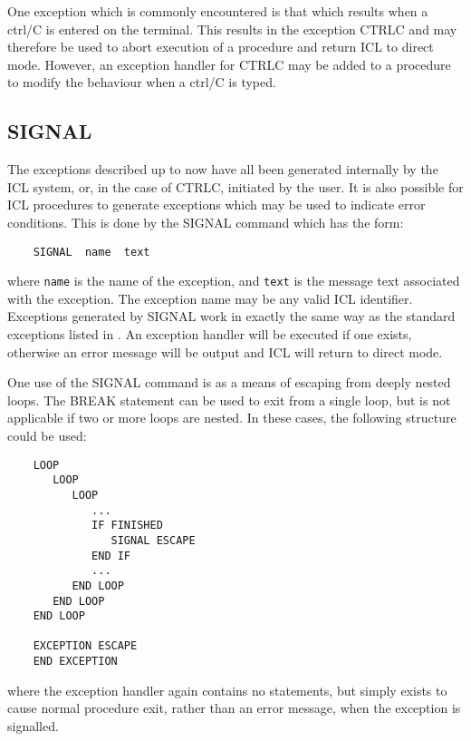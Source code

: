 One exception which is commonly encountered is that which results when a
ctrl/C is entered on the terminal.
This results in the exception CTRLC and may therefore be used to abort execution
of a procedure and return ICL to direct mode.
However, an exception handler for CTRLC may be added to a procedure to modify
the behaviour when a ctrl/C is typed.

\subsection{SIGNAL}

The exceptions described up to now have all been generated internally by the 
ICL system, or, in the case of CTRLC, initiated by the user.
It is also possible for ICL procedures to generate exceptions which may be used
to indicate error conditions.
This is done by the SIGNAL command which has the form:

\begin{small}
\begin{verbatim}
    SIGNAL  name  text
\end{verbatim}
\end{small}

where \verb+name+ is the name of the exception, and \verb+text+ is the message
text associated with the exception.
The exception name may be any valid ICL identifier.
Exceptions generated by SIGNAL work in exactly the same way as the standard
exceptions listed in .
An exception handler will be executed if one exists, otherwise an error message
will be output and ICL will return to direct mode.

One use of the SIGNAL command is as a means of escaping from deeply nested
loops.
The BREAK statement can be used to exit from a single loop, but is not
applicable if two or more loops are nested.
In these cases, the following structure could be used:

\begin{small}
\begin{verbatim}
    LOOP
       LOOP
          LOOP
             ...
             IF FINISHED
                SIGNAL ESCAPE
             END IF
             ...
          END LOOP
       END LOOP
    END LOOP

    EXCEPTION ESCAPE
    END EXCEPTION
\end{verbatim}
\end{small}

where the exception handler again contains no statements, but simply exists
to cause normal procedure exit, rather than an error message, when the 
exception is signalled.

